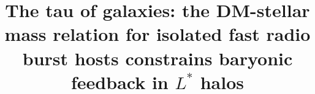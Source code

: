 \documentclass[twocolumn]{aastex631}
\begin{document}
\title{The tau of galaxies: the DM-stellar mass relation for isolated fast radio burst hosts constrains baryonic feedback in $L^*$ halos}


\end{document}
